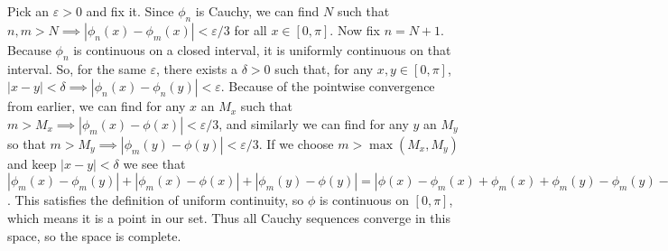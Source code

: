 \documentclass[11pt]{article}
\begin{document}
Pick an $\varepsilon>0$ and fix it. Since $\phi_n$ is Cauchy, we can find
$N$ such that $n,m>N\implies|\phi_n(x)-\phi_m(x)|<\varepsilon/3$ for all
$x\in[0,\pi]$. Now fix $n=N+1$.
Because $\phi_n$ is continuous on a closed interval, it is uniformly continuous on that
interval. So, for the same $\varepsilon$, there exists a $\delta>0$ such that, for any
$x,y\in[0,\pi]$,
$|x-y|<\delta\implies|\phi_n(x)-\phi_n(y)|<\varepsilon$.
Because of the pointwise convergence from earlier, we can find for any $x$
an $M_x$ such that $m>M_x\implies|\phi_m(x)-\phi(x)|<\varepsilon/3$, and similarly we
can find for any $y$ an $M_y$ so that $m>M_y\implies|\phi_m(y)-\phi(y)|<\varepsilon/3$.
If we choose $m>\max(M_x,M_y)$ and keep $|x-y|<\delta$ we see that
$|\phi_m(x)-\phi_m(y)|+|\phi_m(x)-\phi(x)|+|\phi_m(y)-\phi(y)|=
|\phi(x)-\phi_m(x)+\phi_m(x)+\phi_m(y)-\phi_m(y)-\phi(y)|=
|\phi(x)-\phi(y)|<3\cdot\varepsilon/3=\varepsilon$. This satisfies the definition
of uniform continuity, so $\phi$ is continuous on $[0,\pi]$, which means
it is a point in our set. Thus all Cauchy sequences converge in this space,
so the space is complete.
\end{document}
